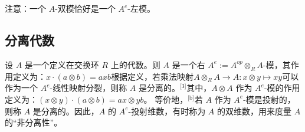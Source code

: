 注意：一个 $A$-双模恰好是一个 $A^e$-左模。
\subsection{分离代数}
设 $A$ 是一个定义在交换环 $R$ 上的代数。则 $A$ 是一个右 $A^e := A^{op} \otimes_R A$-模，其作用定义为：$x \cdot (a \otimes b) = a x b$根据定义，若乘法映射$A \otimes_R A \to A : x \otimes y \mapsto xy$可以作为一个 $A^e$-线性映射分裂，则称 $A$ 是分离的。\(^\text{[3]}\)其中，$A \otimes A$ 作为 $A^e$-模的作用定义为：$(x \otimes y) \cdot (a \otimes b) = a x \otimes y b$。
等价地，\(^\text{[b]}\)若 $A$ 作为 $A^e$-模是投射的，则称 $A$ 是分离的。因此，$A$ 的 $A^e$-投射维数，有时称为 $A$ 的双维数，用来度量 $A$ 的“非分离性”。
